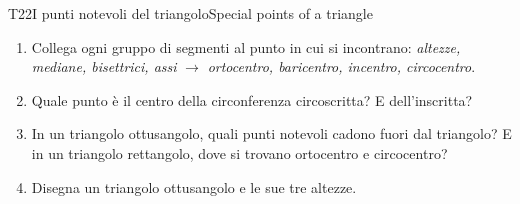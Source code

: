 \begin{esercizio}{T2}{2}{I punti notevoli del triangolo}{Special points of a triangle}
\begin{enumerate}
\item Collega ogni gruppo di segmenti al punto in cui si incontrano: \emph{altezze, mediane, bisettrici, assi} $\to$ \emph{ortocentro, baricentro, incentro, circocentro}.
\item Quale punto è il centro della circonferenza circoscritta? E dell'inscritta?
\item In un triangolo ottusangolo, quali punti notevoli cadono fuori dal triangolo? E in un triangolo rettangolo, dove si trovano ortocentro e circocentro?
\item Disegna un triangolo ottusangolo e le sue tre altezze. 
\end{enumerate}
\end{esercizio}

